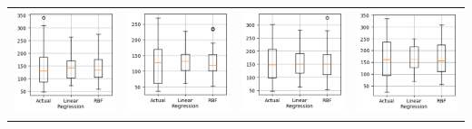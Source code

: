 \documentclass{article}
\begin{document}
\begin{center}
\begin{tabular}{cccc}
\includegraphics[scale=0.4]{result_dist_1} &
\includegraphics[scale=0.4]{result_dist_2} &
\includegraphics[scale=0.4]{result_dist_3} &
\includegraphics[scale=0.4]{result_dist_4}

\end{tabular}
\end{center}
\end{document}
